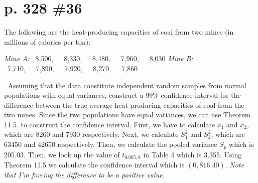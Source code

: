 \documentclass[12pt]{article}
\begin{document}
	\section[20pt]{p. 328 \#36}
	The following are the heat-producing capacities of coal from two mines (in millions of calories per ton):
	\begin{adjustwidth}{1cm}{0cm}
    \begin{flushleft}
      \textit{Mine A: }\ 8,500,\ \ \ 8,330,\ \ \ 8,480,\ \ \ 7,960,\ \ \ 8,030 \newline
			\textit{Mine B: }\ 7,710,\ \ \ 7,890,\ \ \ 7,920,\ \ \ 8,270,\ \ \ 7,860
    \end{flushleft}
  \end{adjustwidth}
\(\ \)
\noindent
Assuming that the data constitute independent random samples from normal populations with equal variances, construct a 99\% confidence interval for the difference between the true average heat-producing capacities of coal from the two mines.
\newline \newline
Since the two populations have equal variances, we can use Theorem 11.5. to construct the confidence interval.
\newline \newline
First, we have to calculate \(\overline{x}_1\) and \(\overline{x}_2\), which are 8260 and 7930 respectively.
\newline
Next, we calculate \(S_1^2\) and \(S_2^2\), which are 63450 and 42650 respectively.
\newline
Then, we calculate the pooled variance \(S_p\) which is 205.03.
\newline \newline
Then, we look up the value of \(t_{0.005,8}\) in Table 4 which is 3.355.
\newline \newline
Using Theorem 11.5 we calculate the confidence interval which is \((0, 816.40)\).
\newline
{}
\newline \newline
\textit{Note that I'm forcing the difference to be a positive value.}
\end{document}

